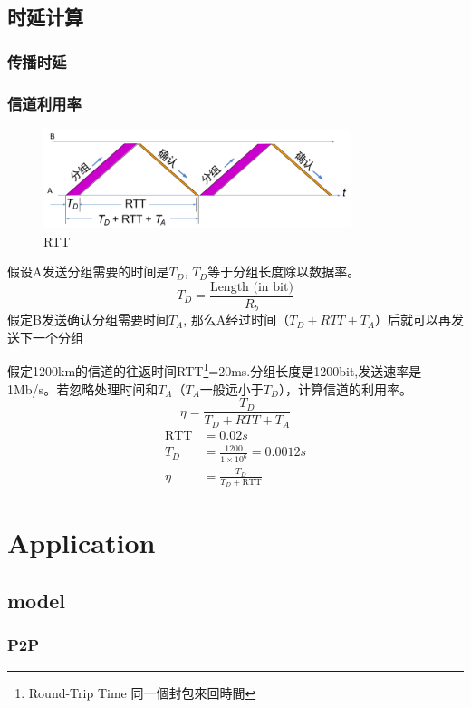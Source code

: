 \documentclass[a4paper]{report}
\begin{document}
\section{时延计算}
\subsection{传播时延}
\subsection{信道利用率}

\begin{figure}[H]
\centering
\includegraphics[width=0.8\textwidth]{rtt.png}
\caption{RTT}
\end{figure}
假设A发送分组需要的时间是$T_D$, $T_D$等于分组长度除以数据率。
\begin{equation}
  T_D=\frac{\text{Length (in bit)}}{R_b}
\end{equation}
假定B发送确认分组需要时间$T_A$, 那么A经过时间（$T_D+RTT+T_A$）后就可以再发送下一个分组

假定1200km的信道的往返时间RTT\footnote{Round-Trip Time 同一個封包來回時間}=20ms.分组长度是1200bit,发送速率是1Mb/s。若忽略处理时间和$T_A$（$T_A$一般远小于$T_D$），计算信道的利用率。
\begin{equation}
  \eta= \frac{T_D}{T_D+RTT+T_A}
\end{equation}
\begin{align*}
  \text{RTT}&=0.02 s\\
  T_D&=\frac{1200}{1\times 10^6}=0.0012 s\\
  \eta&=\frac{T_D}{T_D+\text{RTT}}
\end{align*}


\chapter{Application}
\section{model}
\subsection{P2P}
\end{document}
